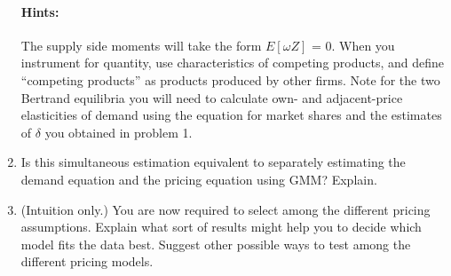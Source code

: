 \documentclass[12pt]{article}
\begin{document}
\begin{enumerate}
\paragraph{Hints:} The supply side moments will take the form \(E[\omega Z]\) = 0. When you instrument for quantity, use characteristics of competing products, and define ``competing products'' as products produced by other firms. Note for the two Bertrand equilibria you will need to calculate own- and adjacent-price elasticities of demand using the equation for market shares and the estimates of \(\delta\) you obtained in problem 1.

\item Is this simultaneous estimation equivalent to separately estimating the demand equation and the pricing equation using GMM? Explain.

\item (Intuition only.)  You are now required to select among the different pricing
assumptions. Explain what sort of results might help you to decide which
model fits the data best. Suggest other possible ways to test among the
different pricing models.

\end{enumerate}
\end{document}
